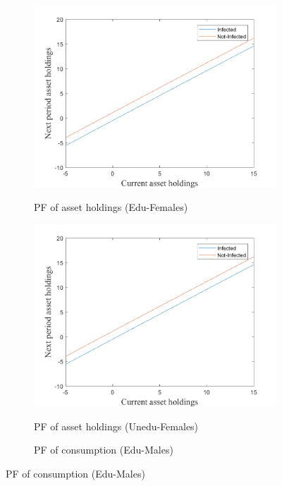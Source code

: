 \begin{figure}
\bigskip
\begin{subfigure}{0.5\textwidth}\caption{PF of asset holdings (Edu-Females)}
   \includegraphics[width=\linewidth,height = 0.22\textheight]{figures/mio/FIG1.png}
    \label{fig_dert}
\end{subfigure}
\hspace*{\fill}
\begin{subfigure}{0.5\textwidth}\caption{PF of asset holdings (Unedu-Females)}
   \includegraphics[width=\linewidth,height = 0.22\textheight]{figures/mio/FIG1.png}
    \label{fig:x_b}
\end{subfigure}
\bigskip
\begin{subfigure}{0.5\textwidth}\caption{PF of consumption (Edu-Males)}

\end{subfigure}
\end{figure}
